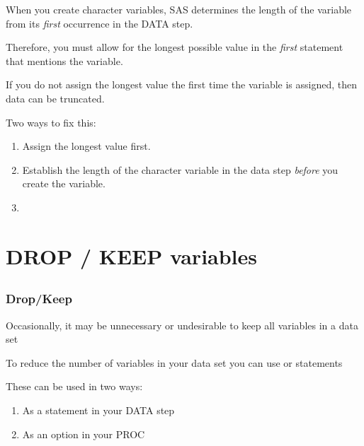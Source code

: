 \begin{frame}
\bi
\item When you create character variables, SAS determines the length of the variable from its \emph{first} occurrence in the DATA step.
\item Therefore, you must allow for the longest possible value in the \emph{first} statement that mentions the variable.
\item If you do not assign the longest value the first time the variable is assigned, then data can be truncated.
\item Two ways to fix this:
    \begin{enumerate}
        \item Assign the longest value first.
        \item Establish the length of the character variable in the data step \emph{before} you create the variable.
        \item[] 
    \end{enumerate}
\ei
\end{frame}

\section[DROP / KEEP variables]{DROP / KEEP variables}
\subsection{}
\begin{frame}
\end{frame}
\begin{frame}
\frametitle{Drop/Keep}
\bi
\item Occasionally, it may be unnecessary or undesirable to keep all variables in a data set
\item To reduce the number of variables in your data set you can use  or  statements
\item These can be used in two ways:
\begin{enumerate}
    \item As a statement in your DATA step
    \item As an option in your PROC
\end{enumerate}
\ei
\end{frame}



